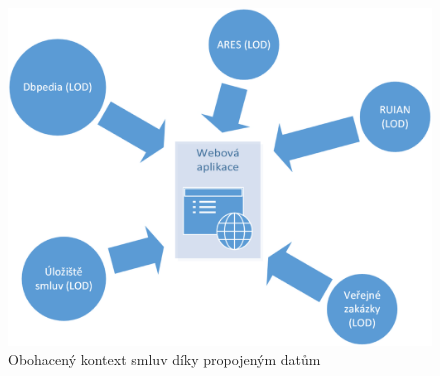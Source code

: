 \begin{figure}[H]
\centerline{\includegraphics[width=120mm]{img/linkedDataAdv.eps}}
\caption{Obohacený kontext smluv díky propojeným datům}
\label{obr:linkedDataAdv}
\end{figure}